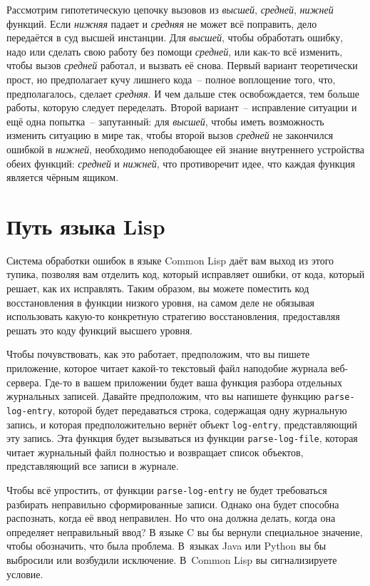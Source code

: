 Рассмотрим гипотетическую цепочку вызовов из \emph{высшей}, \emph{средней}, \emph{нижней}
функций. Если \emph{нижняя} падает и \emph{средняя} не может всё поправить, дело
передаётся в суд высшей инстанции. Для \emph{высшей}, чтобы обработать ошибку, надо или
сделать свою работу без помощи \emph{средней}, или как-то всё изменить, чтобы вызов
\emph{средней} работал, и вызвать её снова. Первый вариант теоретически прост, но
предполагает кучу лишнего кода~-- полное воплощение того, что, предполагалось, сделает
\emph{средняя}. И чем дальше стек освобождается, тем больше работы, которую следует
переделать. Второй вариант~-- исправление ситуации и ещё одна попытка~-- запутанный:
для \emph{высшей}, чтобы иметь возможность изменить ситуацию в мире так, чтобы второй
вызов \emph{средней} не закончился ошибкой в \emph{нижней}, необходимо неподобающее ей
знание внутреннего устройства обеих функций: \emph{средней} и \emph{нижней}, что
противоречит идее, что каждая функция является чёрным ящиком.

\section{Путь языка Lisp}

Система обработки ошибок в языке Common Lisp даёт вам выход из этого тупика, позволяя вам
отделить код, который исправляет ошибки, от кода, который решает, как их исправлять. Таким
образом, вы можете поместить код восстановления в функции низкого уровня, на самом деле не
обязывая использовать какую-то конкретную стратегию восстановления, предоставляя решать
это коду функций высшего уровня.

Чтобы почувствовать, как это работает, предположим, что вы пишете приложение, которое
читает какой-то текстовый файл наподобие журнала веб-сервера. Где-то в вашем приложении
будет ваша функция разбора отдельных журнальных записей. Давайте предположим, что вы
напишете функцию \lstinline{parse-log-entry}, которой будет передаваться строка, содержащая
одну журнальную запись, и которая предположительно вернёт объект \lstinline{log-entry},
представляющий эту запись. Эта функция будет вызываться из функции \lstinline{parse-log-file},
которая читает журнальный файл полностью и возвращает список объектов, представляющий все
записи в журнале.

Чтобы всё упростить, от функции \lstinline{parse-log-entry} не будет требоваться разбирать
неправильно сформированные записи. Однако она будет способна распознать, когда её ввод
неправилен. Но что она должна делать, когда она определяет неправильный ввод? В языке C вы
бы вернули специальное значение, чтобы обозначить, что была проблема. В~языках Java или
Python вы бы выбросили или возбудили исключение. В~Common Lisp вы сигнализируете условие.

